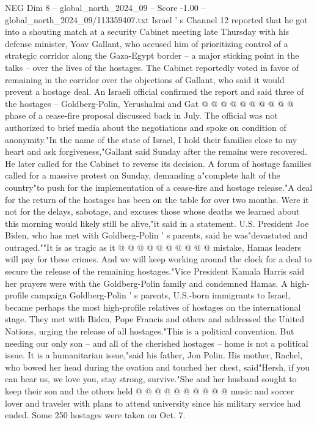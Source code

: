 \begin{textsample}{NEG Dim 8 – global\_north\_2024\_09 – Score -1.00 – global\_north\_2024\_09/113359407.txt}
Israel ' s Channel 12 reported that he got into a shouting match at a security Cabinet meeting late Thursday with his defense minister, Yoav Gallant, who accused him of prioritizing control of a strategic corridor along the Gaza-Egypt border -- a major sticking point in the talks -- over the lives of the hostages.
The Cabinet reportedly voted in favor of remaining in the corridor over the objections of Gallant, who said it would prevent a hostage deal.
An Israeli official confirmed the report and said three of the hostages -- Goldberg-Polin, Yerushalmi and Gat @ @ @ @ @ @ @ @ @ @ phase of a cease-fire proposal discussed back in July.
The official was not authorized to brief media about the negotiations and spoke on condition of anonymity."In the name of the state of Israel, I hold their families close to my heart and ask forgiveness,"Gallant said Sunday after the remains were recovered.
He later called for the Cabinet to reverse its decision.
A forum of hostage families called for a massive protest on Sunday, demanding a"complete halt of the country"to push for the implementation of a cease-fire and hostage release."A deal for the return of the hostages has been on the table for over two months.
Were it not for the delays, sabotage, and excuses those whose deaths we learned about this morning would likely still be alive,"it said in a statement.
U.S.
President Joe Biden, who has met with Goldberg-Polin ' s parents, said he was"devastated and outraged.""It is as tragic as it @ @ @ @ @ @ @ @ @ @ mistake, Hamas leaders will pay for these crimes.
And we will keep working around the clock for a deal to secure the release of the remaining hostages."Vice President Kamala Harris said her prayers were with the Goldberg-Polin family and condemned Hamas.
A high-profile campaign Goldberg-Polin ' s parents, U.S.-born immigrants to Israel, became perhaps the most high-profile relatives of hostages on the international stage.
They met with Biden, Pope Francis and others and addressed the United Nations, urging the release of all hostages."This is a political convention.
But needing our only son -- and all of the cherished hostages -- home is not a political issue.
It is a humanitarian issue,"said his father, Jon Polin.
His mother, Rachel, who bowed her head during the ovation and touched her chest, said"Hersh, if you can hear us, we love you, stay strong, survive."She and her husband sought to keep their son and the others held @ @ @ @ @ @ @ @ @ @ music and soccer lover and traveler with plans to attend university since his military service had ended.
Some 250 hostages were taken on Oct. 7.

\end{textsample}
